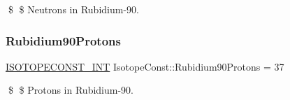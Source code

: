 \$ \$ Neutrons in Rubidium-\/90. \mbox{\label{group___isotope_const-_rubidium-_rb90_gaa107e2b27f275555b371840367150384}} 
\subsubsection{\texorpdfstring{Rubidium90\+Protons}{Rubidium90Protons}}
{\footnotesize\ttfamily \mbox{\hyperlink{group___isotope_const-_macros_ga5f18360b3e99483a35c32d789e62621c}{I\+S\+O\+T\+O\+P\+E\+C\+O\+N\+S\+T\+\_\+\+I\+NT}} Isotope\+Const\+::\+Rubidium90\+Protons = 37}

\$ \$ Protons in Rubidium-\/90. 
